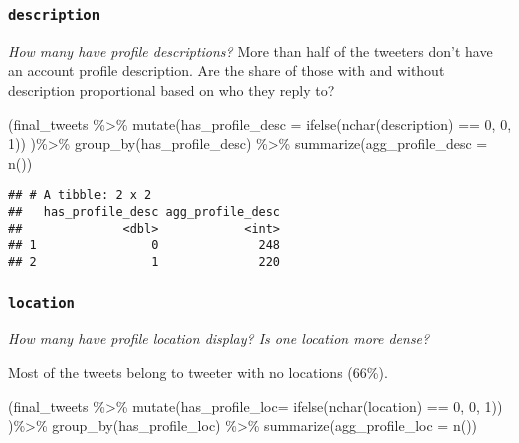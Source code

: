 \documentclass[
]{article}
\newenvironment{Shaded}{\begin{snugshade}}{\end{snugshade}}
\newcommand{\AttributeTok}[1]{\textcolor[rgb]{0.77,0.63,0.00}{#1}}
\newcommand{\DecValTok}[1]{\textcolor[rgb]{0.00,0.00,0.81}{#1}}
\newcommand{\FunctionTok}[1]{\textcolor[rgb]{0.00,0.00,0.00}{#1}}
\newcommand{\NormalTok}[1]{#1}
\newcommand{\SpecialCharTok}[1]{\textcolor[rgb]{0.00,0.00,0.00}{#1}}
\begin{document}
\hypertarget{description}{%
\subsubsection{\texorpdfstring{\texttt{description}}{description}}\label{description}}

\emph{How many have profile descriptions?} More than half of the
tweeters don't have an account profile description. Are the share of
those with and without description proportional based on who they reply
to?

\begin{Shaded}
\begin{Highlighting}[]
\NormalTok{(final\_tweets }\SpecialCharTok{\%\textgreater{}\%} \FunctionTok{mutate}\NormalTok{(}\AttributeTok{has\_profile\_desc =} \FunctionTok{ifelse}\NormalTok{(}\FunctionTok{nchar}\NormalTok{(description) }\SpecialCharTok{==} \DecValTok{0}\NormalTok{, }\DecValTok{0}\NormalTok{, }\DecValTok{1}\NormalTok{)) )}\SpecialCharTok{\%\textgreater{}\%} \FunctionTok{group\_by}\NormalTok{(has\_profile\_desc) }\SpecialCharTok{\%\textgreater{}\%} \FunctionTok{summarize}\NormalTok{(}\AttributeTok{agg\_profile\_desc =} \FunctionTok{n}\NormalTok{())}
\end{Highlighting}
\end{Shaded}

\begin{verbatim}
## # A tibble: 2 x 2
##   has_profile_desc agg_profile_desc
##              <dbl>            <int>
## 1                0              248
## 2                1              220
\end{verbatim}

\hypertarget{location}{%
\subsubsection{\texorpdfstring{\texttt{location}}{location}}\label{location}}

\emph{How many have profile location display? Is one location more
dense?}

Most of the tweets belong to tweeter with no locations (66\%).

\begin{Shaded}
\begin{Highlighting}[]
\NormalTok{(final\_tweets }\SpecialCharTok{\%\textgreater{}\%} \FunctionTok{mutate}\NormalTok{(}\AttributeTok{has\_profile\_loc=} \FunctionTok{ifelse}\NormalTok{(}\FunctionTok{nchar}\NormalTok{(location) }\SpecialCharTok{==} \DecValTok{0}\NormalTok{, }\DecValTok{0}\NormalTok{, }\DecValTok{1}\NormalTok{)) )}\SpecialCharTok{\%\textgreater{}\%} \FunctionTok{group\_by}\NormalTok{(has\_profile\_loc) }\SpecialCharTok{\%\textgreater{}\%} \FunctionTok{summarize}\NormalTok{(}\AttributeTok{agg\_profile\_loc =} \FunctionTok{n}\NormalTok{())}
\end{Highlighting}
\end{Shaded}
\end{document}
